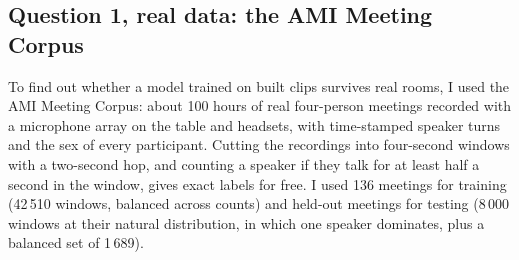 \documentclass[11pt]{article}
\begin{document}
\subsection{Question 1, real data: the AMI Meeting Corpus}
To find out whether a model trained on built clips survives real rooms, I used the AMI Meeting Corpus: about 100 hours of real four-person meetings recorded with a microphone array on the table and headsets, with time-stamped speaker turns and the sex of every participant. Cutting the recordings into four-second windows with a two-second hop, and counting a speaker if they talk for at least half a second in the window, gives exact labels for free. I used 136 meetings for training (42\,510 windows, balanced across counts) and held-out meetings for testing (8\,000 windows at their natural distribution, in which one speaker dominates, plus a balanced set of 1\,689).
\end{document}
